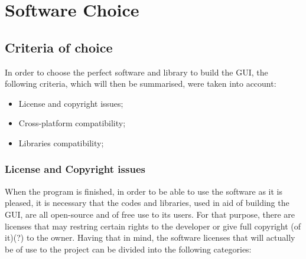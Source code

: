 





\chapter{Software Choice}
\label{cha:module_choice}



\section{Criteria of choice} 
\label{sub:criteria_of_choice}


In order to choose the perfect software and library to build the GUI, the following criteria, which will then be summarised, were taken into account:

\begin{itemize}
  \item License and copyright issues;
  \item Cross-platform compatibility;
  \item Libraries compatibility; 
  
  
\end{itemize}

\subsection{License and Copyright issues}
\label{sub:license_and_copyright}

When the program is finished, in order to be able to use the software as it is pleased, it is necessary that the codes and libraries, used in aid of building the GUI, are all open-source and of free use to its users. For that purpose, there are licenses that may restring certain rights to the developer or give full copyright (of it)(?) to the owner. Having that in mind, the software licenses that will actually be of use to the project can be divided into the following categories:

